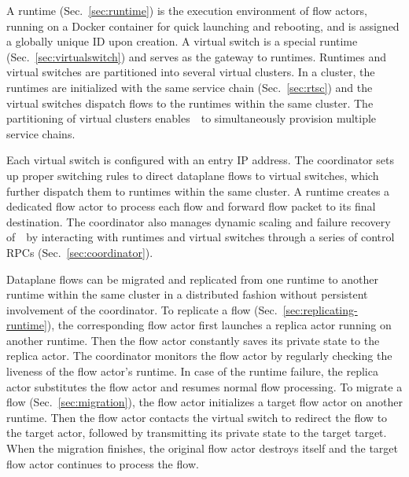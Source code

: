 A runtime (Sec.~\ref{sec:runtime}) is the execution environment of flow actors, running on a Docker container \cite{docker} for quick launching and rebooting, and is assigned a globally unique ID upon creation. A virtual switch is a special runtime (Sec.~\ref{sec:virtualswitch}) and serves as the gateway to runtimes.
Runtimes and virtual switches are partitioned into several virtual clusters. In a cluster, the runtimes are initialized with the same service chain (Sec.~\ref{sec:rtsc}) and the virtual switches dispatch flows to the runtimes within the same cluster. The partitioning of virtual clusters enables~\nfactor~to simultaneously provision multiple service chains.

Each virtual switch is configured with an entry IP address. The coordinator sets up proper switching rules %
to direct dataplane flows to virtual switches, which further dispatch them to runtimes within the same cluster. A runtime creates a dedicated flow actor to process each flow and forward flow packet to its final destination.
The coordinator also manages dynamic scaling and failure recovery of~\nfactor~by interacting with runtimes and virtual switches through a series of control RPCs (Sec.~\ref{sec:coordinator}).

Dataplane flows can be migrated and replicated from one runtime to another runtime within the same cluster in a distributed fashion without persistent involvement of the coordinator. To replicate a flow (Sec.~\ref{sec:replicating-runtime}), the corresponding flow actor first launches a replica actor running on another runtime. Then the flow actor constantly saves its private state to the replica actor. The coordinator monitors the flow actor by regularly checking the liveness of the flow actor's runtime. In case of the runtime failure, the replica actor substitutes the flow actor and resumes normal flow processing. To migrate a flow (Sec.~\ref{sec:migration}), the flow actor initializes a target flow actor on another runtime. Then the flow actor contacts the virtual switch to redirect the flow to the target actor, followed by transmitting its private state to the target target. When the migration finishes, the original flow actor destroys itself and the target flow actor continues to process the flow.

